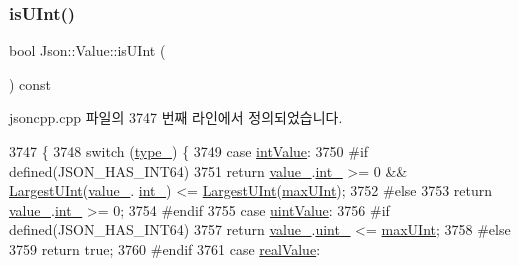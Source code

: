 \subsubsection{\texorpdfstring{is\+U\+Int()}{isUInt()}}
{\footnotesize\ttfamily bool Json\+::\+Value\+::is\+U\+Int (\begin{DoxyParamCaption}{ }\end{DoxyParamCaption}) const}



jsoncpp.\+cpp 파일의 3747 번째 라인에서 정의되었습니다.


\begin{DoxyCode}
3747                          \{
3748   \textcolor{keywordflow}{switch} (\hyperlink{class_json_1_1_value_abd222c2536dc88bf330dedcd076d2356}{type\_}) \{
3749   \textcolor{keywordflow}{case} \hyperlink{namespace_json_a7d654b75c16a57007925868e38212b4eae5a9d708d5c9e23ae9bf98898522512d}{intValue}:
3750 \textcolor{preprocessor}{#if defined(JSON\_HAS\_INT64)}
3751     \textcolor{keywordflow}{return} \hyperlink{class_json_1_1_value_aef578244546212705b9f81eb84d7e151}{value\_}.\hyperlink{union_json_1_1_value_1_1_value_holder_adbfb384301298844ed955ba5cf6015a0}{int\_} >= 0 && \hyperlink{class_json_1_1_value_a6682a3684d635e03fc06ba229fa24eec}{LargestUInt}(\hyperlink{class_json_1_1_value_aef578244546212705b9f81eb84d7e151}{value\_}.
      \hyperlink{union_json_1_1_value_1_1_value_holder_adbfb384301298844ed955ba5cf6015a0}{int\_}) <= \hyperlink{class_json_1_1_value_a6682a3684d635e03fc06ba229fa24eec}{LargestUInt}(\hyperlink{class_json_1_1_value_ac79e63ee68d3aa914bfd6988be669b87}{maxUInt});
3752 \textcolor{preprocessor}{#else}
3753     \textcolor{keywordflow}{return} \hyperlink{class_json_1_1_value_aef578244546212705b9f81eb84d7e151}{value\_}.\hyperlink{union_json_1_1_value_1_1_value_holder_adbfb384301298844ed955ba5cf6015a0}{int\_} >= 0;
3754 \textcolor{preprocessor}{#endif}
3755   \textcolor{keywordflow}{case} \hyperlink{namespace_json_a7d654b75c16a57007925868e38212b4eaea788d9a3bb00adc6d68d97d43e1ccd3}{uintValue}:
3756 \textcolor{preprocessor}{#if defined(JSON\_HAS\_INT64)}
3757     \textcolor{keywordflow}{return} \hyperlink{class_json_1_1_value_aef578244546212705b9f81eb84d7e151}{value\_}.\hyperlink{union_json_1_1_value_1_1_value_holder_aab65665dc15a24a29a8e93cdeeaa7e50}{uint\_} <= \hyperlink{class_json_1_1_value_ac79e63ee68d3aa914bfd6988be669b87}{maxUInt};
3758 \textcolor{preprocessor}{#else}
3759     \textcolor{keywordflow}{return} \textcolor{keyword}{true};
3760 \textcolor{preprocessor}{#endif}
3761   \textcolor{keywordflow}{case} \hyperlink{namespace_json_a7d654b75c16a57007925868e38212b4eab837c7b869c14d8be712deb45c9e490e}{realValue}:

\end{DoxyCode}
